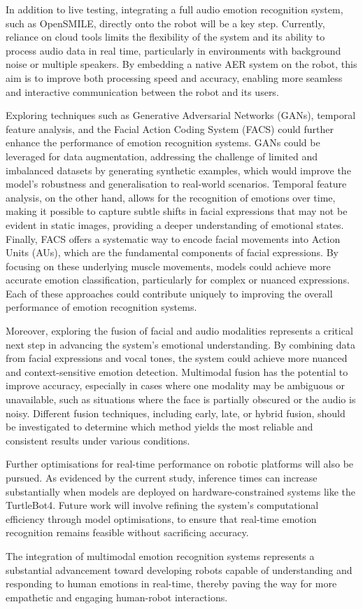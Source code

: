 In addition to live testing, integrating a full audio emotion recognition system, such as OpenSMILE, directly onto the robot will be a key step. Currently, reliance on cloud tools limits the flexibility of the system and its ability to process audio data in real time, particularly in environments with background noise or multiple speakers. By embedding a native AER system on the robot, this aim is to improve both processing speed and accuracy, enabling more seamless and interactive communication between the robot and its users.

Exploring techniques such as Generative Adversarial Networks (GANs), temporal feature analysis, and the Facial Action Coding System (FACS) could further enhance the performance of emotion recognition systems. GANs could be leveraged for data augmentation, addressing the challenge of limited and imbalanced datasets by generating synthetic examples, which would improve the model’s robustness and generalisation to real-world scenarios. Temporal feature analysis, on the other hand, allows for the recognition of emotions over time, making it possible to capture subtle shifts in facial expressions that may not be evident in static images, providing a deeper understanding of emotional states. Finally, FACS offers a systematic way to encode facial movements into Action Units (AUs), which are the fundamental components of facial expressions. By focusing on these underlying muscle movements, models could achieve more accurate emotion classification, particularly for complex or nuanced expressions. Each of these approaches could contribute uniquely to improving the overall performance of emotion recognition systems.

Moreover, exploring the fusion of facial and audio modalities represents a critical next step in advancing the system's emotional understanding. By combining data from facial expressions and vocal tones, the system could achieve more nuanced and context-sensitive emotion detection. Multimodal fusion has the potential to improve accuracy, especially in cases where one modality may be ambiguous or unavailable, such as situations where the face is partially obscured or the audio is noisy. Different fusion techniques, including early, late, or hybrid fusion, should be investigated to determine which method yields the most reliable and consistent results under various conditions.

Further optimisations for real-time performance on robotic platforms will also be pursued. As evidenced by the current study, inference times can increase substantially when models are deployed on hardware-constrained systems like the TurtleBot4. Future work will involve refining the system’s computational efficiency through model optimisations, to ensure that real-time emotion recognition remains feasible without sacrificing accuracy.

The integration of multimodal emotion recognition systems represents a substantial advancement toward developing robots capable of understanding and responding to human emotions in real-time, thereby paving the way for more empathetic and engaging human-robot interactions.
